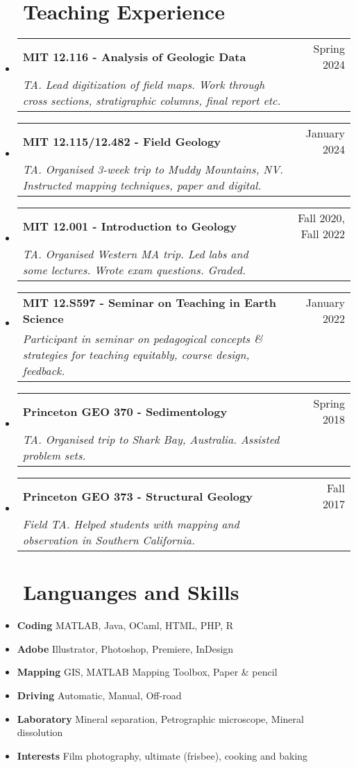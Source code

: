 \documentclass[letterpaper,20pt]{article}
\makeatletter
\newcommand{\resumeItem}[2]{
  \item\normalsize{
    \textbf{#1}{ #2 \vspace{-2pt}}
  }
}
\newcommand{\resumeSubheading}[4]{
  \vspace{-1pt}\item
    \begin{tabular*}{0.97\textwidth}{l@{\extracolsep{\fill}}r}
      \textbf{#1} & #2 \\
      \textit{#3} & \textit{#4} \\
    \end{tabular*}\vspace{-5pt}
}
\newcommand{\resumeSubItem}[2]{\resumeItem{#1}{#2}\vspace{-3pt}}
\newcommand{\resumeSubHeadingListStart}{\begin{itemize}[leftmargin=*]}
\newcommand{\resumeSubHeadingListEnd}{\end{itemize}}
\makeatother
\begin{document}
\vspace{3pt}
\section{~~Teaching Experience}
  \resumeSubHeadingListStart
    \resumeSubheading
    {MIT 12.116 - Analysis of Geologic Data}{Spring 2024}
    {TA. Lead digitization of field maps. Work through cross sections, stratigraphic columns, final report etc.}{} 
    \resumeSubheading
    {MIT 12.115/12.482 - Field Geology}{January 2024}
    {TA. Organised 3-week trip to Muddy Mountains, NV. Instructed mapping techniques, paper and digital.}{} 
    \resumeSubheading
    {MIT 12.001 - Introduction to Geology}{Fall 2020, Fall 2022}
    {TA. Organised Western MA trip. Led labs and some lectures. Wrote exam questions. Graded.}{} 
    \resumeSubheading
    {MIT 12.S597 - Seminar on Teaching in Earth Science}{January 2022}
    {Participant in seminar on pedagogical concepts \& strategies for teaching equitably, course design, feedback.}{}
  \resumeSubheading
    {Princeton GEO 370 - Sedimentology}{Spring 2018}
    {TA. Organised trip to Shark Bay, Australia. Assisted problem sets.}{} 
  \resumeSubheading
    {Princeton GEO 373 - Structural Geology}{Fall 2017}
    {Field TA. Helped students with mapping and observation in Southern California.}{} 
    \resumeSubHeadingListEnd


\vspace{3pt}
\section{~~Languanges and Skills}
  \resumeSubHeadingListStart
    \resumeSubItem{Coding}{MATLAB, Java, OCaml, HTML, PHP, R}
    \resumeSubItem{Adobe}{Illustrator, Photoshop, Premiere, InDesign}
    \resumeSubItem{Mapping}{GIS, MATLAB Mapping Toolbox, Paper \& pencil}
    \resumeSubItem{Driving}{Automatic, Manual, Off-road}
    \resumeSubItem{Laboratory}{Mineral separation, Petrographic microscope, Mineral dissolution}
    \resumeSubItem{Interests}{Film photography, ultimate (frisbee), cooking and baking}
    \resumeSubHeadingListEnd
    
\vspace{3pt}
\end{document}
